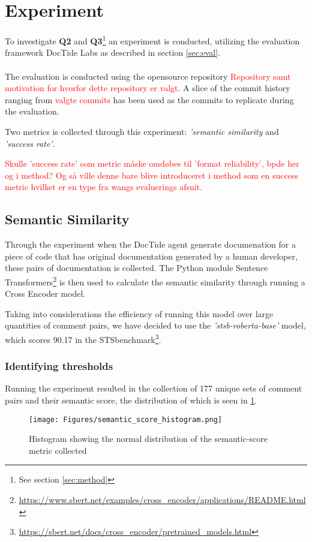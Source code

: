 \section{Experiment}
\label{sec:exp}
To investigate \textbf{Q2} and \textbf{Q3}\footnote{See section \ref{sec:method}} an experiment is conducted, utilizing the evaluation framework DocTide Labs as described in section \ref{sec:eval}. 
\\ \\
The evaluation is conducted using the opensource repository \textcolor{red}{Repository samt motivation for hvorfor dette repository er valgt.} A slice of the commit history ranging from \textcolor{red}{valgte commits} has been used as the commits to replicate during the evaluation.

Two metrics is collected through this experiment: \textit{'semantic similarity} and \textit{'success rate'}.

\textcolor{red}{Skulle 'success rate' som metric måske omdøbes til 'format reliability', bpde her og i method? Og så ville denne bare blive introduceret i method som en success metric hvilket er en type fra wangs evaluerings afsnit.}


\subsection{Semantic Similarity}
Through the experiment when the DocTide agent generate documenation for a piece of code that has original documentation generated by a human developer, these pairs of documentation is collected. The Python module Sentence Transformers\footnote{\url{https://www.sbert.net/examples/cross_encoder/applications/README.html}} is then used to calculate the semantic similarity through running a Cross Encoder model.

Taking into considerations the efficiency of running this model over large quantities of comment pairs, we have decided to use the \textit{'stsb-roberta-base'} model, which scores 90.17 in the STSbenchmark\footnote{\url{https://sbert.net/docs/cross_encoder/pretrained_models.html}}.
\subsubsection{Identifying thresholds}
Running the experiment resulted in the collection of 177 unique sets of comment pairs and their semantic score, the distribution of which is seen in \cref{fig:sem_hist}.
\begin{figure}[H]
\centering
\texttt{[image: Figures/semantic\_score\_histogram.png]}
\caption{Histogram showing the normal distribution of the semantic-score metric collected}
\label{fig:sem_hist}
\end{figure}

